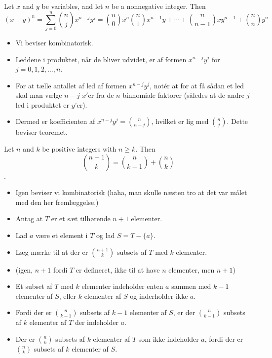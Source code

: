 \documentclass{beamer}
\begin{document}
\begin{frame}[allowframebreaks]
\begin{itemize}
  \end{itemize}
  \begin{theorem}
    Let $x$ and $y$ be variables, and let $n$ be a nonnegative integer. Then
    \[ (x+y)^{n} = \sum_{j=0}^{n} \binom{n}{j} x^{n-j}y^{j} = \binom{n}{0}x^{n} \binom{n}{1}x^{n-1}y + \cdots + \binom{n}{n-1}xy^{n-1} + \binom{n}{n} y^{n} \]
  \end{theorem}
  \begin{itemize}
  \item Vi beviser kombinatorisk. 
  \item Leddene i produktet, når de bliver udvidet, er af formen $x^{n-j}y^{j}$ for $j = 0, 1, 2, \ldots, n$. 
  \item For at tælle antallet af led af formen $x^{n-j}y^{j}$, notér at for at få sådan et led skal man vælge $n-j$ $x'$er fra de $n$ binnomiale faktorer (således at de andre $j$ led i produktet er $y$'er). 
  \item Dermed er koefficienten af $x^{n-j}y^{j} = \binom{n}{n-j}$, hvilket er lig med $\binom{n}{j}$. Dette beviser teoremet. 
  \end{itemize}
  \begin{theorem}
Let $n$ and $k$ be positive integers with $n \geq k$. Then \[ \binom{n+1}{k} = \binom{n}{k-1} + \binom{n}{k} \].
  \end{theorem}
  \begin{itemize}
  \item Igen beviser vi kombinatorisk (haha, man skulle næsten tro at det var målet med den her fremlæggelse.)
  \item Antag at $T$ er et sæt tilhørende $n+1$ elementer. 
  \item Lad $a$ være et element i $T$ og lad $S = T - \{a\}$.
  \item Læg mærke til at der er $\binom{n+1}{k}$ subsets af $T$ med $k$ elementer. 
  \item (igen, $n+1$ fordi $T$ er defineret, ikke til at have $n$ elementer, men $n+1$)
  \item Et subset af $T$ med $k$ elementer indeholder enten $a$ sammen med $k-1$ elementer af $S$, eller $k$ elementer af $S$ og inderholder ikke $a$.
  \item Fordi der er $\binom{n}{k-1}$ subsets af $k-1$ elementer af $S$, er der $\binom{n}{k-1}$ subsets af $k$ elementer af $T$ der indeholder $a$. 
  \item Der er $\binom{n}{k}$ subsets af $k$ elementer af $T$ som ikke indeholder $a$, fordi der er $\binom{n}{k}$ subsets af $k$ elementer af $S$.

\end{itemize}
\end{frame}
\end{document}
